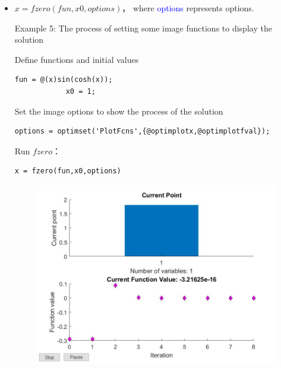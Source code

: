 \documentclass[10pt,math=newtx,citestyle=gb7714-2015,bibstyle=gb7714-2015]{elegantbook}
\begin{document}
{{{\begin{itemize}
		$x=2.0946$
		
		Example 4: Root of a function with parameters
		\begin{lstlisting}[frame=shadowbox]
			myfun = @(x,c) cos(c*x);  % parameterized function
			c = 2;                    % parameter
			fun = @(x) myfun(x,c);    % function of x alone
			x = fzero(fun,0.1)
		\end{lstlisting}
		
		$x=0.7854$
		
		\item $x=fzero(fun,x0,options)$， where \textcolor{blue}{options} represents options.
		
		Example 5: The process of setting some image functions to display the solution
		
		Define functions and initial values
		
		\begin{lstlisting}[frame=shadowbox]
			fun = @(x)sin(cosh(x));
			x0 = 1;
		\end{lstlisting}
		
		Set the image options to show the process of the solution
		\begin{lstlisting}[frame=shadowbox]
			options = optimset('PlotFcns',{@optimplotx,@optimplotfval});
		\end{lstlisting}
		
		Run $fzero$：
		\begin{lstlisting}[frame=shadowbox]
			x = fzero(fun,x0,options)
		\end{lstlisting}
		
		\begin{figure}[htbp!]
			\centering
			\includegraphics[width=0.8\linewidth]{FIG/options}
			\centering
		\end{figure}
		

\end{itemize}}}}
\end{document}

